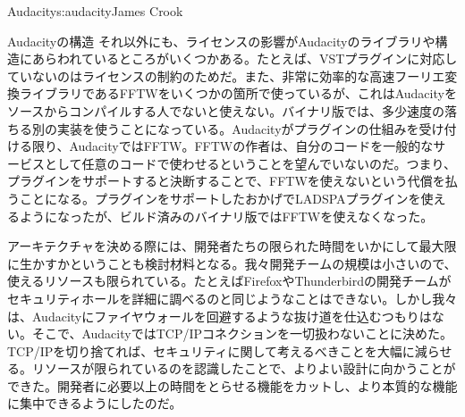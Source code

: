 \begin{aosachapter}{Audacity}{s:audacity}{James Crook}
\begin{aosasect1}{Audacityの構造}
それ以外にも、ライセンスの影響がAudacityのライブラリや構造にあらわれているところがいくつかある。たとえば、VSTプラグインに対応していないのはライセンスの制約のためだ。また、非常に効率的な高速フーリエ変換ライブラリであるFFTWをいくつかの箇所で使っているが、これはAudacityをソースからコンパイルする人でないと使えない。バイナリ版では、多少速度の落ちる別の実装を使うことになっている。Audacityがプラグインの仕組みを受け付ける限り、AudacityではFFTW。FFTWの作者は、自分のコードを一般的なサービスとして任意のコードで使わせるということを望んでいないのだ。つまり、プラグインをサポートすると決断することで、FFTWを使えないという代償を払うことになる。プラグインをサポートしたおかげでLADSPAプラグインを使えるようになったが、ビルド済みのバイナリ版ではFFTWを使えなくなった。

アーキテクチャを決める際には、開発者たちの限られた時間をいかにして最大限に生かすかということも検討材料となる。我々開発チームの規模は小さいので、使えるリソースも限られている。たとえばFirefoxやThunderbirdの開発チームがセキュリティホールを詳細に調べるのと同じようなことはできない。しかし我々は、Audacityにファイヤウォールを回避するような抜け道を仕込むつもりはない。そこで、AudacityではTCP/IPコネクションを一切扱わないことに決めた。TCP/IPを切り捨てれば、セキュリティに関して考えるべきことを大幅に減らせる。リソースが限られているのを認識したことで、よりよい設計に向かうことができた。開発者に必要以上の時間をとらせる機能をカットし、より本質的な機能に集中できるようにしたのだ。


\end{aosasect1}
\end{aosachapter}
